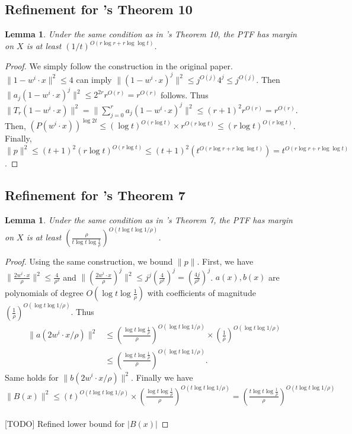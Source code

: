 \documentclass{article}
\newtheorem{lemma}[theorem]{Lemma}
\begin{document}
\subsection{Refinement for \cite{klivans2004learning}'s Theorem 10}
\begin{lemma}
Under the same condition as in \cite{klivans2004learning}'s Theorem 10, the PTF has margin on $X$ is at least $(1/t)^{O(r\log r + r\log\log t)}$. 
\end{lemma}
\begin{proof}
We simply follow the construction in the original paper. $\|1-w^i\cdot x\|^2\leq 4$ can imply $\|(1-w^i\cdot x)^j\|^2\leq j^{O(j)}4^j \leq j^{O(j)}$. Then $\|a_j(1-w^i\cdot x)^j\|^2\leq 2^{2r}r^{O(r)}=r^{O(r)}$ follows. Thus $\|T_r(1-w^i\cdot x)\|^2=\|\sum_{j=0}^r a_j (1-w^i\cdot x)^j\|^2 \leq (r+1)^2 r^{O(r)} = r^{O(r)}$. Then, $\left(P(w^i\cdot x)\right)^{\log 2t}\leq (\log t)^{O(r\log t)}\times r^{O(r\log t)}\leq (r\log t)^{O(r\log t)}$. Finally, $\|p\|^2\leq (t+1)^2 (r\log t)^{O(r\log t)} \leq (t+1)^2 \left(  t^{O(r\log r + r\log\log t)}\right) = t^{O(r\log r + r\log\log t)}$.  
\end{proof}

\subsection{Refinement for \cite{klivans2004learning}'s Theorem 7}
\begin{lemma}
Under the same condition as in \cite{klivans2004learning}'s Theorem 7, the PTF has margin on $X$ is at least $\left( \frac{\rho}{t\log t \log \frac{1}{\rho}} \right)^{O(t\log t\log 1/\rho)}$. 
\end{lemma}
\begin{proof}
Using the same construction, we bound $\|p\|$. First, we have $\|\frac{2w^i\cdot x}{\rho}\|^2\leq \frac{4}{\rho^2}$ and $\|\left(\frac{2w^i\cdot x}{\rho}\right)^j\|^2\leq j^j\left(\frac{4}{\rho^2}\right)^j=\left(\frac{4j}{\rho^2}\right)^j$. $a(x), b(x)$ are polynomials of degree $O(\log t\log \frac{1}{\rho})$ with coefficients of magnitude $\left(\frac{1}{\rho}\right)^{O(\log t\log 1/\rho)}$. Thus 
\begin{align*}
    \|a(2w^i\cdot x/\rho)\|^2 &\leq 
    \left( \frac{\log t \log \frac{1}{\rho}}{\rho} \right)^{O(\log t\log 1/\rho)}  \times  \left(\frac{1}{\rho}\right)^{O(\log t\log 1/\rho)}\\
    &\leq \left( \frac{\log t \log \frac{1}{\rho}}{\rho} \right)^{O(\log t\log 1/\rho)}.
\end{align*}
Same holds for $\|b(2w^i\cdot x/\rho)\|^2$. Finally we have $\|B(x)\|^2 \leq (t)^{O(t\log t\log 1/\rho)} \times \left( \frac{\log t \log \frac{1}{\rho}}{\rho} \right)^{O(t\log t\log 1/\rho)} = \left( \frac{t\log t \log \frac{1}{\rho}}{\rho} \right)^{O(t\log t\log 1/\rho)}$\\ 
\ \\ 
{\color{red}[TODO] Refined lower bound for $|B(x)|$}

\end{proof}
\end{document}

